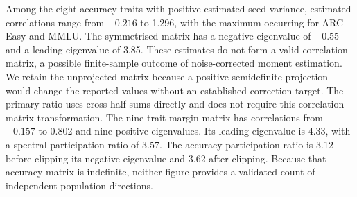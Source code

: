 Among the eight accuracy traits with positive estimated seed variance, estimated correlations range from $-0.216$ to 1.296, with the maximum occurring for ARC-Easy and MMLU. The symmetrised matrix has a negative eigenvalue of $-0.55$ and a leading eigenvalue of 3.85. These estimates do not form a valid correlation matrix, a possible finite-sample outcome of noise-corrected moment estimation. We retain the unprojected matrix because a positive-semidefinite projection would change the reported values without an established correction target. The primary ratio uses cross-half sums directly and does not require this correlation-matrix transformation. The nine-trait margin matrix has correlations from $-0.157$ to 0.802 and nine positive eigenvalues. Its leading eigenvalue is 4.33, with a spectral participation ratio of 3.57. The accuracy participation ratio is 3.12 before clipping its negative eigenvalue and 3.62 after clipping. Because that accuracy matrix is indefinite, neither figure provides a validated count of independent population directions.

